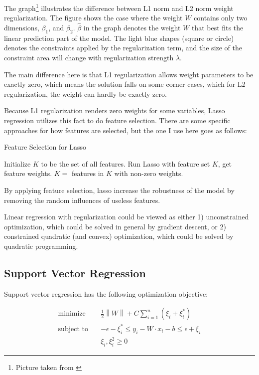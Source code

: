 \documentclass[a4paper]{article}
\newcommand{\norm}[1]{\left\lVert#1\right\rVert}
\begin{document}
The graph\footnote{Picture taken from \cite{cmuLasso}} illustrates the difference between L1 norm and L2 norm weight regularization. The figure shows the case where the weight $W$ contains only two dimensions, $\beta_1$, and $\beta_2$. $\hat{\beta}$ in the graph denotes the weight $W$ that best fits the linear prediction part of the model. The light blue shapes (square or circle) denotes the constraints applied by the regularization term, and the size of the constraint area will change with regularization strength $\lambda$.

The main difference here is that L1 regularization allows weight parameters to be exactly zero, which means the solution falls on some corner cases, which for L2 regularization, the weight can hardly be exactly zero. 

Because L1 regularization renders zero weights for some variables, Lasso regression utilizes this fact to do feature selection. There are some specific approaches for how features are selected, but the one I use here goes as follows:
\begin{algorithm}
\caption{Feature Selection for Lasso}
\begin{algorithmic}[1]
\State Initialize $K$ to be the set of all features.
\Repeat
\State Run Lasso with feature set $K$, get feature weights.
\State $K = $ features in $K$ with non-zero weights.
\end{algorithmic}
\end{algorithm}

By applying feature selection, lasso increase the robustness of the model by removing the random influences of useless features.

Linear regression with regularization could be viewed as either 1) unconstrained  optimization, which could be solved in general by gradient descent, or 2) constrained quadratic (and convex) optimization, which could be solved by quadratic programming.

\subsection{Support Vector Regression}

Support vector regression \citep{basak2007support} has the following optimization objective:

\begin{align}
\text{minimize} \quad & \frac{1}{2} \norm{W} + C \sum_{i=1}^{n} (\xi_i + \xi_i^*) \\
\text{subject to} \quad & - \epsilon  -\xi_i^* \leq y_i -  W \cdot x_i - b \leq \epsilon + \xi_i \\
& \xi_i, \xi_i^2 \geq 0
\end{align}
\end{document}
